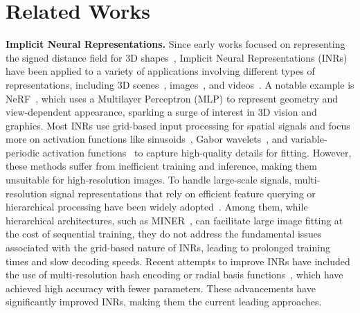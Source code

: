 \section{Related Works}

\noindent\textbf{Implicit Neural Representations.}
Since early works focused on representing the signed distance field for 3D shapes~\cite{chen2019learning, park2019deepsdf, xu2019disn, michalkiewicz2019implicit}, Implicit Neural Representations (INRs) have been applied to a variety of applications involving different types of representations, including 3D scenes~\cite{mildenhall2021nerf, barron2021mip}, images~\cite{saragadam2022miner, dupont2021coin, strumpler2022implicit, chen2021learning}, and videos~\cite{chen2021nerv, chen2023hnerv, li2022nerv}. A notable example is NeRF~\cite{mildenhall2021nerf}, which uses a Multilayer Perceptron (MLP) to represent geometry and view-dependent appearance, sparking a surge of interest in 3D vision and graphics. Most INRs use grid-based input processing for spatial signals and focus more on activation functions like sinusoids~\cite{sitzmann2020implicit}, Gabor wavelets~\cite{saragadam2023wire}, and variable-periodic activation functions~\cite{liu2024finer} to capture high-quality details for fitting. However, these methods suffer from inefficient training and inference, making them unsuitable for high-resolution images. To handle large-scale signals, multi-resolution signal representations that rely on efficient feature querying or hierarchical processing have been widely adopted~\cite{muller2022instant, saragadam2022miner, martel2021acorn, chen2023neurbf}. Among them,  while hierarchical architectures, such as MINER~\cite{saragadam2022miner}, can facilitate large image fitting at the cost of sequential training, they do not address the fundamental issues associated with the grid-based nature of INRs, leading to prolonged training times and slow decoding speeds. Recent attempts to improve INRs have included the use of multi-resolution hash encoding or radial basis functions~\cite{muller2022instant, chen2023neurbf}, which have achieved high accuracy with fewer parameters. These advancements have significantly improved INRs, making them the current leading approaches.

